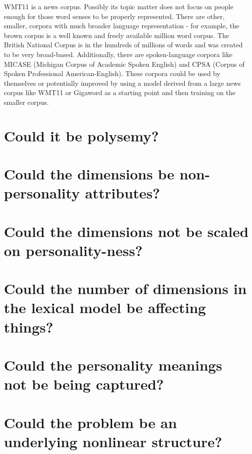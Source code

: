 \documentclass[eric_thesis.tex]{subfiles}
\begin{document}
WMT11 is a news corpus. Possibly its topic matter does not focus on people enough for those word senses to be properly represented. There are other, smaller, corpora with much broader language representation - for example, the brown corpus is a well known and freely available million word corpus. The British National Corpus is in the hundreds of millions of words and was created to be very broad-based. Additionally, there are spoken-language corpora like MICASE (Michigan Corpus of Academic Spoken English) and CPSA (Corpus of Spoken Professional American-English). These corpora could be used by themselves or potentially improved by using a model derived from a large news corpus like WMT11 or Gigaword as a starting point and then training on the smaller corpus.

\section{Could it be polysemy?}

\section{Could the dimensions be non-personality attributes?}
\section{Could the dimensions not be scaled on personality-ness?}


\section{Could the number of dimensions in the lexical model be affecting things?}

\section{Could the personality meanings not be being captured?}


\section{Could the problem be an underlying nonlinear structure?}
\end{document}
